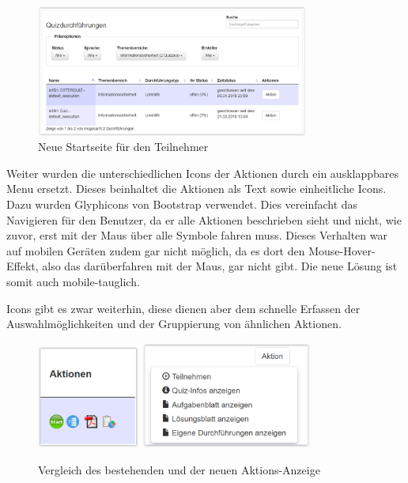 \begin{figure}[H]
	\centering
	\includegraphics[width=0.8\textwidth]{Images/Startseite_neu.PNG}
	\caption{Neue Startseite für den Teilnehmer}
\end{figure}


Weiter wurden die unterschiedlichen Icons der Aktionen durch ein ausklappbares Menu ersetzt. Dieses beinhaltet die Aktionen als Text sowie einheitliche Icons. Dazu wurden Glyphicons von Bootstrap \cite{glyphicons} verwendet. Dies vereinfacht das Navigieren für den Benutzer, da er alle Aktionen beschrieben sieht und nicht, wie zuvor, erst mit der Maus über alle Symbole fahren muss. Dieses Verhalten war auf mobilen Geräten zudem gar nicht möglich, da es dort den \glqq Mouse-Hover-Effekt\grqq, also das darüberfahren mit der Maus, gar nicht gibt. Die neue Lösung ist somit auch mobile-tauglich.

Icons gibt es zwar weiterhin, diese dienen aber dem schnelle Erfassen der Auswahlmöglichkeiten und der Gruppierung von ähnlichen Aktionen.


\begin{figure}[H]
	\centering
	\includegraphics[width=0.3\textwidth]{Images/Aktionen_alt.PNG}
	\includegraphics[width=0.5\textwidth]{Images/Aktionen_neu.PNG}
	\caption{Vergleich des bestehenden und der neuen Aktions-Anzeige}
	\cite{mobilequiz.ch}
\end{figure}







